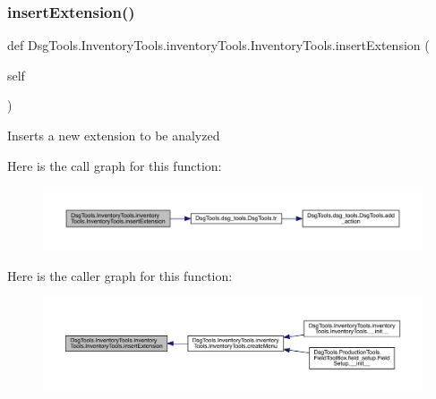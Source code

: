 \subsubsection{\texorpdfstring{insert\+Extension()}{insertExtension()}}
{\footnotesize\ttfamily def Dsg\+Tools.\+Inventory\+Tools.\+inventory\+Tools.\+Inventory\+Tools.\+insert\+Extension (\begin{DoxyParamCaption}\item[{}]{self }\end{DoxyParamCaption})}

\begin{DoxyVerb}Inserts a new extension to be analyzed
\end{DoxyVerb}
 Here is the call graph for this function\+:
\nopagebreak
\begin{figure}[H]
\begin{center}
\leavevmode
\includegraphics[width=350pt]{class_dsg_tools_1_1_inventory_tools_1_1inventory_tools_1_1_inventory_tools_a9cb93926117e29913885ec0f35ebe83c_cgraph}
\end{center}
\end{figure}
Here is the caller graph for this function\+:
\nopagebreak
\begin{figure}[H]
\begin{center}
\leavevmode
\includegraphics[width=350pt]{class_dsg_tools_1_1_inventory_tools_1_1inventory_tools_1_1_inventory_tools_a9cb93926117e29913885ec0f35ebe83c_icgraph}
\end{center}
\end{figure}
\mbox{\label{class_dsg_tools_1_1_inventory_tools_1_1inventory_tools_1_1_inventory_tools_aa776be8684ed702367fbfb08257d7e07}} 
